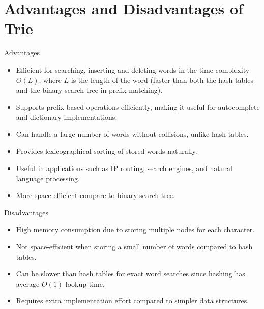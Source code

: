 \section{Advantages and Disadvantages of Trie}

\begin{frame}{Advantages}
    \begin{itemize}[label=$\star$]
    \item Efficient for searching, inserting and deleting words in the time complexity $O(L)$, where $L$ is the length of the word (faster than both the hash tables and the binary search tree in prefix matching).
    \item Supports prefix-based operations efficiently, making it useful for autocomplete and dictionary implementations.
    \item Can handle a large number of words without collisions, unlike hash tables.
    \item Provides lexicographical sorting of stored words naturally.
    \item Useful in applications such as IP routing, search engines, and natural language processing.
    \item More space efficient compare to binary search tree.
\end{itemize}
\end{frame}

\begin{frame}{Disadvantages}
    \begin{itemize}[label=$\star$]
    \item High memory consumption due to storing multiple nodes for each character.
    \item Not space-efficient when storing a small number of words compared to hash tables.
    \item Can be slower than hash tables for exact word searches since hashing has average $O(1)$ lookup time.
    \item Requires extra implementation effort compared to simpler data structures.
\end{itemize}

\end{frame}
